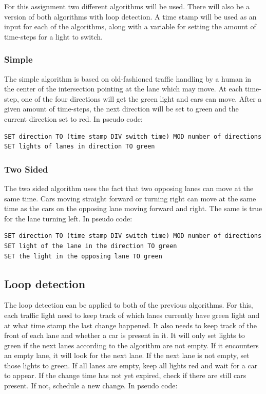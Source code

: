 \documentclass[a4paper,11pt]{article}
\begin{document}
For this assignment two different algorithms will be used.
There will also be a version of both algorithms with loop detection.
A time stamp will be used as an input for each of the algorithms, along
with a variable for setting the amount of time-steps for a light to switch.

\subsubsection*{Simple}
The simple algorithm is based on old-fashioned traffic handling by
a human in the center of the intersection pointing at the lane which may move.
At each time-step, one of the four directions will get the green light and cars can move.
After a given amount of time-steps, the next direction will be set to green and the current direction set to red.
In pseudo code:

\begin{lstlisting}
SET direction TO (time stamp DIV switch time) MOD number of directions
SET lights of lanes in direction TO green
\end{lstlisting}


\subsubsection*{Two Sided}
The two sided algorithm uses the fact that two opposing lanes can move at the same time.
Cars moving straight forward or turning right can move at the same time as the cars on the
opposing lane moving forward and right. The same is true for the lane turning left.
In pseudo code:

\begin{lstlisting}
SET direction TO (time stamp DIV switch time) MOD number of directions
SET light of the lane in the direction TO green
SET the light in the opposing lane TO green
\end{lstlisting}

\subsection*{Loop detection}
The loop detection can be applied to both of the previous algorithms.
For this, each traffic light need to keep track of which lanes currently have green light
and at what time stamp the last change happened.
It also needs to keep track of the front of each lane and whether a car is present in it.
It will only set lights to green if the next lanes according to the algorithm are not empty.
If it encounters an empty lane, it will look for the next lane.
If the next lane is not empty, set those lights to green.
If all lanes are empty, keep all lights red and wait for a car to appear.
If the change time has not yet expired, check if there are still cars present.
If not, schedule a new change.
In pseudo code:
\end{document}
